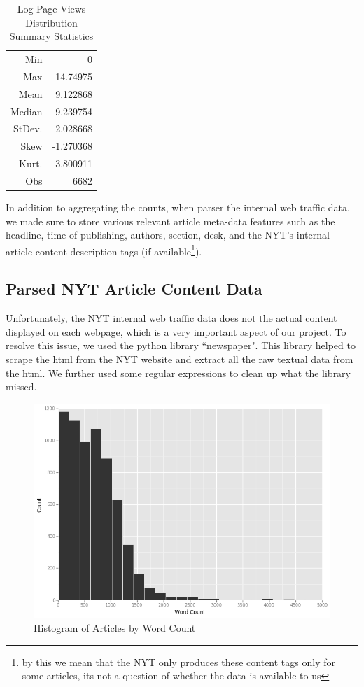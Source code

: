 \documentclass[fleqn,12pt]{SelfArx} %
\begin{document}
\begin{table}[hbt]
\caption{Log Page Views Distribution Summary Statistics}
\centering
\begin{tabular}{rr}
\toprule
Min               &  0\\
Max               &  14.74975\\  
Mean              &  9.122868\\
Median            &  9.239754\\
StDev.            &  2.028668\\
Skew              &  -1.270368\\
Kurt.             &  3.800911\\
\midrule
Obs &  6682\\
\bottomrule
\end{tabular}
\end{table}


In addition to aggregating the counts, when parser the internal web traffic data, we made sure to store various relevant article meta-data features such as the headline, time of publishing, authors, section, desk, and the NYT's internal article content description tags (if available\footnote{by this we mean that the NYT only produces these content tags only for some articles, its not a question of whether the data is available to us}).

\subsection{Parsed NYT Article Content Data}
Unfortunately, the NYT internal web traffic data does not the actual content displayed on each webpage, which is a very important aspect of our project. To resolve this issue, we used the python library ``newspaper". This library helped to scrape the html from the NYT website and extract all the raw textual data from the html. We further used some regular expressions to clean up what the library missed. 




\begin{figure}[ht]\centering
\includegraphics[width=\linewidth]{wordcount_hist}
\caption{Histogram of Articles by Word Count}
\label{fig:pv_hist}
\end{figure}
\end{document}
